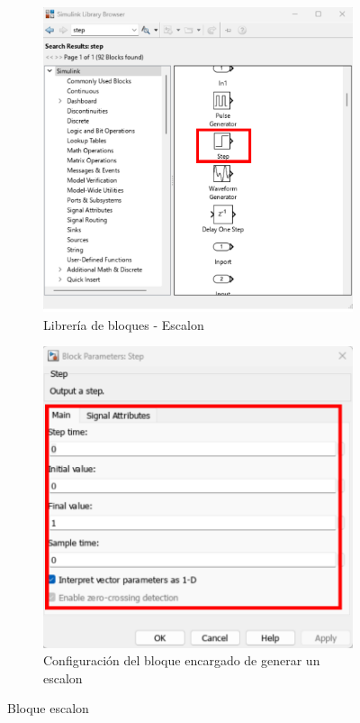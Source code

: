 \begin{figure}[htbp]
    \centering
    \begin{subfigure}[b]{0.35\textwidth}
        \centering
        \includegraphics[width=\textwidth]{fig/Capitulo5/Caso_de_estudio_PID/lib_step.pdf}
        \caption{Librería de bloques - Escalon}
        \label{fig:step_lib}
    \end{subfigure}
    \hfill
    \begin{subfigure}[b]{0.45\textwidth}
        \centering
        \includegraphics[width=\textwidth]{fig/Capitulo5/Caso_de_estudio_PID/config_step.pdf}
        \caption{Configuración del bloque encargado de generar un escalon }
        \label{fig:step_conf}
    \end{subfigure}
    \caption{Bloque escalon}
    \label{fig:step_block}
\end{figure}

